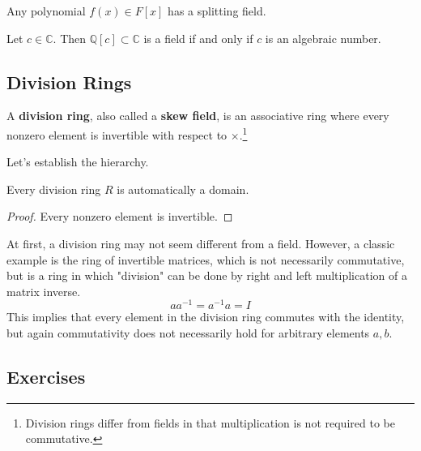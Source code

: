   \begin{corollary}
    Any polynomial $f(x) \in F[x]$ has a splitting field. 
  \end{corollary}

  \begin{corollary}
    Let $c \in \mathbb{C}$. Then $\mathbb{Q}[c] \subset \mathbb{C}$ is a field if and only if $c$ is an algebraic number. 
  \end{corollary}

\subsection{Division Rings}

  \begin{definition}
    A \textbf{division ring}, also called a \textbf{skew field}, is an associative ring where every nonzero element is invertible with respect to $\times$.\footnote{Division rings differ from fields in that multiplication is not required to be commutative. }
  \end{definition}

  Let's establish the hierarchy. 

  \begin{lemma}
    Every division ring $R$ is automatically a domain. 
  \end{lemma}
  \begin{proof}
    Every nonzero element is invertible. 
  \end{proof}

  \begin{example}
    At first, a division ring may not seem different from a field. However, a classic example is the ring of invertible matrices, which is not necessarily commutative, but is a ring in which "division" can be done by right and left multiplication of a matrix inverse. 
    \begin{equation}
      a a^{-1} = a^{-1} a = I
    \end{equation}
    This implies that every element in the division ring commutes with the identity, but again commutativity does not necessarily hold for arbitrary elements $a, b$. 
  \end{example} 

\subsection{Exercises} 

